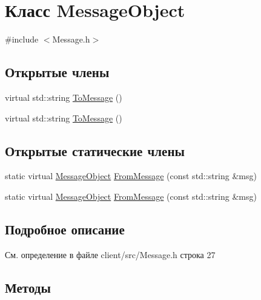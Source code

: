 \hypertarget{class_message_object}{}\section{Класс Message\+Object}
\label{class_message_object}


{\ttfamily \#include $<$Message.\+h$>$}

\subsection*{Открытые члены}
\begin{DoxyCompactItemize}
\item 
virtual std\+::string \mbox{\hyperlink{class_message_object_ae123b0190cfd5623d0846593bf36de72}{To\+Message}} ()
\item 
virtual std\+::string \mbox{\hyperlink{class_message_object_ae123b0190cfd5623d0846593bf36de72}{To\+Message}} ()
\end{DoxyCompactItemize}
\subsection*{Открытые статические члены}
\begin{DoxyCompactItemize}
\item 
static virtual \mbox{\hyperlink{class_message_object}{Message\+Object}} \mbox{\hyperlink{class_message_object_a492e505739b933025fe9e7b0f8ee7aec}{From\+Message}} (const std\+::string \&msg)
\item 
static virtual \mbox{\hyperlink{class_message_object}{Message\+Object}} \mbox{\hyperlink{class_message_object_a492e505739b933025fe9e7b0f8ee7aec}{From\+Message}} (const std\+::string \&msg)
\end{DoxyCompactItemize}


\subsection{Подробное описание}


См. определение в файле client/src/\+Message.\+h строка 27



\subsection{Методы}
\mbox{\label{class_message_object_a492e505739b933025fe9e7b0f8ee7aec}} 
